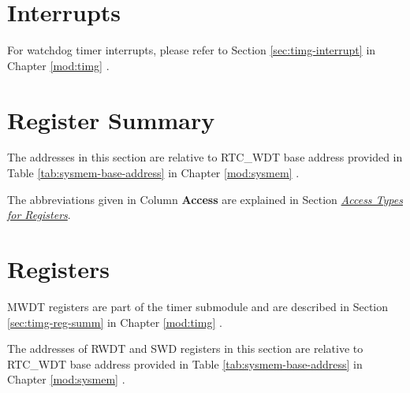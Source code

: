 \documentclass[main\_\_EN.tex]{subfiles}
\begin{document}
\section{Interrupts}

For watchdog timer interrupts, please refer to Section \ref{sec:timg-interrupt} \textit{} in Chapter \ref{mod:timg} \textit{}.



\section{Register Summary}\label{sec:wdt-reg-summ}

The addresses in this section are relative to RTC\_WDT base address provided in Table \ref{tab:sysmem-base-address} in Chapter \ref{mod:sysmem} \textit{}.

The abbreviations given in Column \textbf{Access} are explained in Section \hyperref[glossary-access-types]{\textit{Access Types for Registers}}.




\section{Registers}

MWDT registers are part of the timer submodule and are described in Section \ref{sec:timg-reg-summ} \textit{} in Chapter \ref{mod:timg} \textit{}.

The addresses of RWDT and SWD registers in this section are relative to RTC\_WDT base address provided in Table \ref{tab:sysmem-base-address} in Chapter \ref{mod:sysmem} \textit{}.




\end{document}
